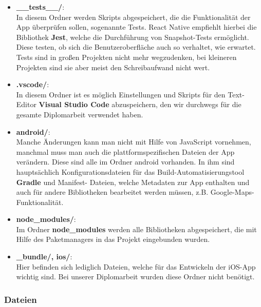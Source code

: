 \begin{itemize}
\item \textbf{\_\_tests\_\_/}:\\
In diesem Ordner werden Skripts abgespeichert, die die Funktionalität der App überprüfen sollen,
sogenannte Tests. React Native empfiehlt hierbei die Bibliothek \textbf{Jest}, welche die Durchführung von
Snapshot-Tests ermöglicht. Diese testen, ob sich die Benutzeroberfläche auch so verhaltet, wie
erwartet. Tests sind in großen Projekten nicht mehr wegzudenken, bei kleineren Projekten sind sie
aber meist den Schreibaufwand nicht wert.

\item \textbf{.vscode/}:\\
In diesem Ordner ist es möglich Einstellungen und Skripts für den Text-Editor \textbf{Visual Studio Code}
abzuspeichern, den wir durchwegs für die gesamte Diplomarbeit verwendet haben.

\item \textbf{android/}:\\
Manche Änderungen kann man nicht mit Hilfe von JavaScript vornehmen, manchmal muss man auch die
plattformspezifischen Dateien der App verändern. Diese sind alle im Ordner android vorhanden. In ihm
sind hauptsächlich Konfigurationsdateien für das Build-Automatisierungstool \textbf{Gradle} und Manifest-
Dateien, welche Metadaten zur App enthalten und auch für andere Bibliotheken bearbeitet werden
müssen, z.B. Google-Maps-Funktionalität.

\item \textbf{node\_modules/}:\\
Im Ordner \textbf{node\_modules} werden alle Bibliotheken abgespeichert, die mit Hilfe des Paketmanagers
in das Projekt eingebunden wurden.

\item \textbf{\_bundle/, ios/}:\\
Hier befinden sich lediglich Dateien, welche für das Entwickeln der iOS-App wichtig sind. Bei
unserer Diplomarbeit wurden diese Ordner nicht benötigt.

\end{itemize}

\newpage
\subsubsection{Dateien}

